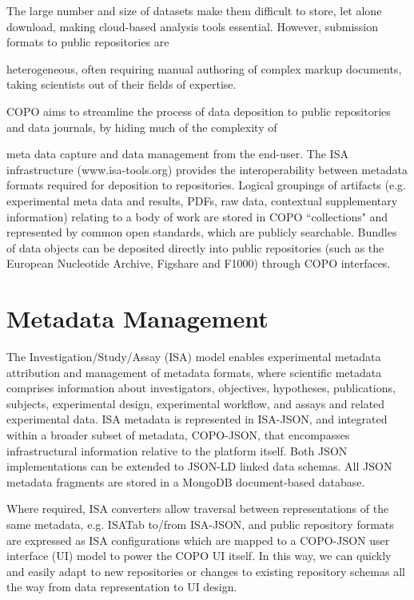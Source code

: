 \documentclass[runningheads,a4paper]{llncs}
\begin{document}
The large number and size of datasets make them difficult to
store, let alone download, making cloud-based analysis tools essential. However, submission formats to public repositories are

heterogeneous, often requiring manual authoring of complex markup
documents, taking scientists out of their fields of expertise.

COPO aims to streamline the process of data deposition to public
repositories and data journals, by hiding much of the complexity of

meta data capture and data management from the end-user. The ISA
infrastructure (www.isa-tools.org) provides the
interoperability between metadata formats required for deposition to repositories.  Logical groupings of artifacts (e.g. experimental meta data
and results, PDFs, raw data, contextual supplementary information)
relating to a body of work are stored in COPO “collections" and
represented by common open standards, which are publicly
searchable. Bundles of data objects can be
deposited directly into public repositories (such as the European Nucleotide Archive, Figshare and F1000) through COPO interfaces.


\vspace*{-0.3in}
\section{Metadata Management}

The Investigation/Study/Assay (ISA) model enables experimental
metadata attribution and management of metadata formats, where
scientific metadata comprises information about investigators,
objectives, hypotheses, publications, subjects, experimental design,
experimental workflow, and assays and related experimental data. ISA
metadata is represented in ISA-JSON, and integrated within a broader
subset of metadata, COPO-JSON, that encompasses infrastructural
information relative to the platform itself. Both JSON implementations
can be extended to JSON-LD linked data schemas. All JSON metadata
fragments are stored in a MongoDB document-based database.

Where required, ISA converters allow traversal between representations
of the same metadata, e.g. ISATab to/from ISA-JSON, and public
repository formats are expressed as ISA configurations which are
mapped to a COPO-JSON user interface (UI) model to power the COPO UI
itself. In this way, we can quickly and easily adapt to new
repositories or changes to existing repository schemas all the way
from data representation to UI design.
\end{document}
